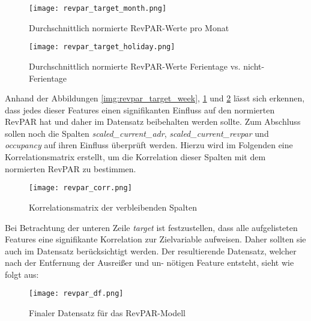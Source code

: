 \begin{figure}[h]
    \centering
    \texttt{[image: revpar\_target\_month.png]}
    \caption[Durchschnittlich normierte RevPAR-Werte pro Monat]{Durchschnittlich normierte RevPAR-Werte pro Monat}
    \label{img:revpar_target_month}
\end{figure}
\newpage
\begin{figure}[h]
    \centering
    \texttt{[image: revpar\_target\_holiday.png]}
    \caption[Durchschnittlich normierte RevPAR-Werte Ferientage vs. nicht-Ferientage]{Durchschnittlich normierte RevPAR-Werte Ferientage vs. nicht-Ferientage}
    \label{img:revpar_target_holiday}
\end{figure}

Anhand der Abbildungen \ref{img:revpar_target_week}, \ref{img:revpar_target_month} und \ref{img:revpar_target_holiday} lässt sich erkennen, dass jedes dieser Features einen signifikanten Einfluss auf den normierten RevPAR hat und daher im Datensatz beibehalten werden sollte.
\newline 
\newline
Zum Abschluss sollen noch die Spalten \emph{scaled\_current\_adr}, \emph{scaled\_current\_revpar} und \emph{occupancy} auf ihren Einfluss überprüft werden. Hierzu wird im Folgenden eine Korrelationsmatrix erstellt, um die Korrelation dieser Spalten mit dem normierten RevPAR zu bestimmen.

\begin{figure}[h]
    \centering
    \texttt{[image: revpar\_corr.png]}
    \caption[Korrelationsmatrix der verbleibenden Spalten]{Korrelationsmatrix der verbleibenden Spalten}
    \label{img:revpar_corr}
\end{figure}

Bei Betrachtung der unteren Zeile \emph{target} ist festzustellen, dass alle aufgelisteten Features eine signifikante Korrelation zur Zielvariable aufweisen. Daher sollten sie auch im Datensatz berücksichtigt werden.
\newline 
\newline 
Der resultierende Datensatz, welcher nach der Entfernung der Ausreißer und un- nötigen Feature entsteht, sieht wie folgt aus:

\begin{figure}[h]
    \centering
    \texttt{[image: revpar\_df.png]}
    \caption[Finaler Datensatz für das RevPAR-Modell]{Finaler Datensatz für das RevPAR-Modell}
    \label{img:revpar_df}
\end{figure}

